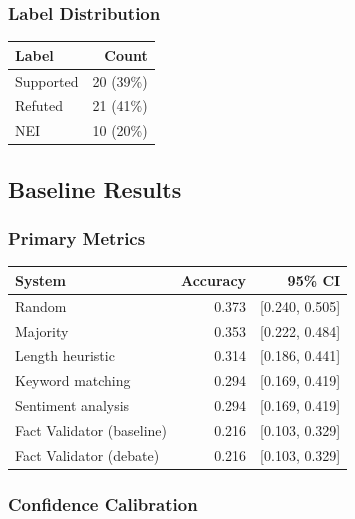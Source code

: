\documentclass[12pt,a4paper,twoside]{article}
\begin{document}
\subsubsection{Label Distribution}

\begin{table}[H]
    \centml\centering
    \begin{tabular}{|l|r|}
        \hline
        \textbf{Label} & \textbf{Count} \\
        \hline
        Supported & 20 (39\%) \\
        Refuted & 21 (41\%) \\
        NEI & 10 (20\%) \\
        \hline
    \end{tabular}
\end{table}

\subsection{Baseline Results}

\subsubsection{Primary Metrics}

\begin{table}[H]
    \centering
    \begin{tabular}{|l|r|r|}
        \hline
        \textbf{System} & \textbf{Accuracy} & \textbf{95\% CI} \\
        \hline
        Random & 0.373 & [0.240, 0.505] \\
        Majority & 0.353 & [0.222, 0.484] \\
        Length heuristic & 0.314 & [0.186, 0.441] \\
        Keyword matching & 0.294 & [0.169, 0.419] \\
        Sentiment analysis & 0.294 & [0.169, 0.419] \\
        Fact Validator (baseline) & 0.216 & [0.103, 0.329] \\
        Fact Validator (debate) & 0.216 & [0.103, 0.329] \\
        \hline
    \end{tabular}
\end{table}

\subsubsection{Confidence Calibration}
\end{document}
